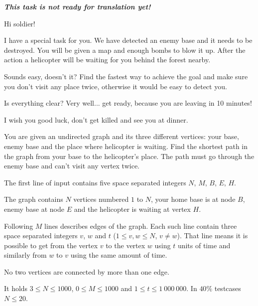 





\textbf{\textit{This task is not ready for translation yet!}}

\noindent
Hi soldier!

\bigskip \noindent
I have a special task for you. We have detected an enemy base and it needs to be destroyed. You will be given a map and enough bombs to blow it up. After the action a helicopter will be waiting for you behind the forest nearby.

\bigskip \noindent
Sounds easy, doesn't it? Find the fastest way to achieve the goal and make sure you don't visit any place twice, otherwise it would be easy to detect you.

\bigskip \noindent
Is everything clear? Very well... get ready, because you are leaving in 10 minutes!

\bigskip \noindent
I wish you good luck, don't get killed and see you at dinner.


You are given an undirected graph and its three different vertices: your base, enemy base and the place where helicopter is waiting. Find the shortest path in the graph from your base to the helicopter's place. The path must go through the enemy base and can't visit any vertex twice.


The first line of input contains five space separated integers $N$, $M$, $B$, $E$, $H$.

The graph contains $N$ vertices numbered $1$ to $N$, your home base is at node $B$, enemy base at node $E$ and the helicopter is waiting at vertex $H$.

Following $M$ lines describes edges of the graph.
Each such line contain three space separated integers $v$, $w$ and $t$ ($1 \le v, w \le N$, $v \neq w$). That line means it is possible to get from the vertex $v$ to the vertex $w$ using $t$ units of time and similarly from $w$ to $v$ using the same amount of time.

No two vertices are connected by more than one edge.

It holds $3 \le N \le 1000$, $0 \le M \le 1000$ and $1 \le t \le 1\ 000\ 000$.
In $40\%$ testcases $N\le 20$.

